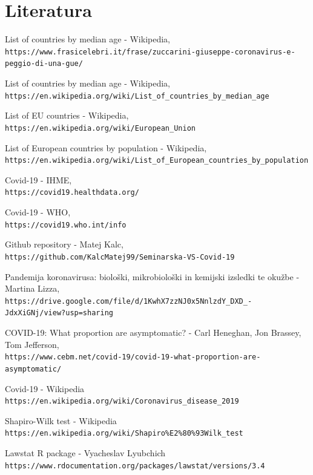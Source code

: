 \documentclass[a4paper,11pt]{article}
\begin{document}
\section{Literatura}

\begin{thebibliography}{9}

List of countries by median age - Wikipedia,
\\\texttt{https://www.frasicelebri.it/frase/zuccarini-giuseppe-coronavirus-e-peggio-di-una-gue/}

List of countries by median age - Wikipedia,
\\\texttt{https://en.wikipedia.org/wiki/List\_of\_countries\_by\_median\_age}

List of EU countries - Wikipedia,
\\\texttt{https://en.wikipedia.org/wiki/European\_Union}


List of European countries by population - Wikipedia,
\\\texttt{https://en.wikipedia.org/wiki/List\_of\_European\_countries\_by\_population}


Covid-19 - IHME,
\\\texttt{https://covid19.healthdata.org/}


Covid-19 - WHO,
\\\texttt{https://covid19.who.int/info}


Github repository - Matej Kalc,
\\\texttt{https://github.com/KalcMatej99/Seminarska-VS-Covid-19}


Pandemija koronavirusa: biološki, mikrobiološki in kemijski izsledki te okužbe - Martina Lizza,
\\\texttt{https://drive.google.com/file/d/1KwhX7zzNJ0x5NnlzdY\_DXD\_-JdxXiGNj/view?usp=sharing}

COVID-19: What proportion are asymptomatic? - Carl Heneghan, Jon Brassey, Tom Jefferson,
\\\texttt{https://www.cebm.net/covid-19/covid-19-what-proportion-are-asymptomatic/}

Covid-19 - Wikipedia
\\\texttt{https://en.wikipedia.org/wiki/Coronavirus\_disease\_2019}

Shapiro-Wilk test - Wikipedia
\\\texttt{https://en.wikipedia.org/wiki/Shapiro\%E2\%80\%93Wilk\_test}

Lawstat R package - Vyacheslav Lyubchich
\\\texttt{https://www.rdocumentation.org/packages/lawstat/versions/3.4}



\end{thebibliography}
\end{document}
